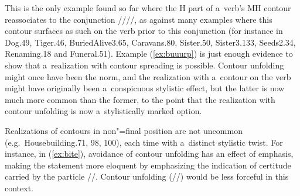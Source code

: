This is the only example found so far where the H part of a~verb’s MH contour reassociates to the
conjunction ////, as against many examples where this contour surfaces as such on the
verb prior to this conjunction (for instance in Dog.49, Tiger.46, BuriedAlive3.65, Caravans.80, Sister.50,
Sister3.133, Seeds2.34, Renaming.18 and Funeral.51). Example (\ref{ex:buuurp}) is just enough evidence
to show that a~realization with contour spreading is possible. Contour unfolding might once have
been the norm, and the realization with a~contour on the verb might have originally been
a~conspicuous stylistic effect, but the latter is now much more common than the former, to the point
that the realization with contour unfolding is now a~stylistically marked option.

Realizations of contours in non"=final position are not uncommon (e.g.~Housebuilding.71, 98, 100), each time with a~distinct stylistic twist. For instance, in (\ref{ex:bite}), avoidance of contour unfolding has an effect of emphasis, making the statement more eloquent by emphasizing the indication of {certitude} carried by the particle //. Contour unfolding (//) would be less forceful in this context. 

